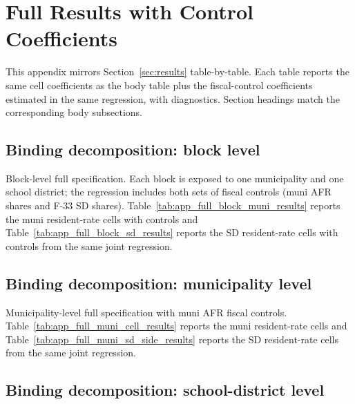 \documentclass[12pt]{article}
\begin{document}
\appendix

\section{Full Results with Control Coefficients}
\label{app:full-results}

This appendix mirrors Section~\ref{sec:results} table-by-table.
Each table reports the same cell coefficients as the body table
plus the fiscal-control coefficients estimated in the same
regression, with diagnostics. Section headings match the
corresponding body subsections.

\subsection{Binding decomposition: block level}
\label{app:full-block}

Block-level full specification. Each block is exposed to one
municipality and one school district; the regression includes both
sets of fiscal controls (muni AFR shares and F-33 SD shares).
Table~\ref{tab:app_full_block_muni_results} reports the
muni resident-rate cells with controls and
Table~\ref{tab:app_full_block_sd_results} reports the SD
resident-rate cells with controls from the same joint regression.





\subsection{Binding decomposition: municipality level}
\label{app:full-muni}

Municipality-level full specification with muni AFR fiscal
controls. Table~\ref{tab:app_full_muni_cell_results} reports the
muni resident-rate cells and
Table~\ref{tab:app_full_muni_sd_side_results} reports the SD
resident-rate cells from the same joint regression.





\subsection{Binding decomposition: school-district level}
\label{app:full-sd}
\end{document}
